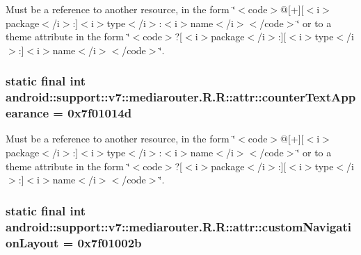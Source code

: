 Must be a reference to another resource, in the form \char`\"{}$<$code$>$@\mbox{[}+\mbox{]}\mbox{[}$<$i$>$package$<$/i$>$:\mbox{]}$<$i$>$type$<$/i$>$:$<$i$>$name$<$/i$>$$<$/code$>$\char`\"{} or to a theme attribute in the form \char`\"{}$<$code$>$?\mbox{[}$<$i$>$package$<$/i$>$:\mbox{]}\mbox{[}$<$i$>$type$<$/i$>$:\mbox{]}$<$i$>$name$<$/i$>$$<$/code$>$\char`\"{}. \hypertarget{classandroid_1_1support_1_1v7_1_1mediarouter_1_1_r_1_1attr_a9acd16216aaf56b83297e0f9bdbf3ac}{
\subsubsection[{counterTextAppearance}]{\setlength{\rightskip}{0pt plus 5cm}static final int android::support::v7::mediarouter.R.R::attr::counterTextAppearance = 0x7f01014d}}
\label{classandroid_1_1support_1_1v7_1_1mediarouter_1_1_r_1_1attr_a9acd16216aaf56b83297e0f9bdbf3ac}


Must be a reference to another resource, in the form \char`\"{}$<$code$>$@\mbox{[}+\mbox{]}\mbox{[}$<$i$>$package$<$/i$>$:\mbox{]}$<$i$>$type$<$/i$>$:$<$i$>$name$<$/i$>$$<$/code$>$\char`\"{} or to a theme attribute in the form \char`\"{}$<$code$>$?\mbox{[}$<$i$>$package$<$/i$>$:\mbox{]}\mbox{[}$<$i$>$type$<$/i$>$:\mbox{]}$<$i$>$name$<$/i$>$$<$/code$>$\char`\"{}. \hypertarget{classandroid_1_1support_1_1v7_1_1mediarouter_1_1_r_1_1attr_b415fc15dbfb32bb00ff2ab40517bfc7}{
\subsubsection[{customNavigationLayout}]{\setlength{\rightskip}{0pt plus 5cm}static final int android::support::v7::mediarouter.R.R::attr::customNavigationLayout = 0x7f01002b}}
\label{classandroid_1_1support_1_1v7_1_1mediarouter_1_1_r_1_1attr_b415fc15dbfb32bb00ff2ab40517bfc7}


